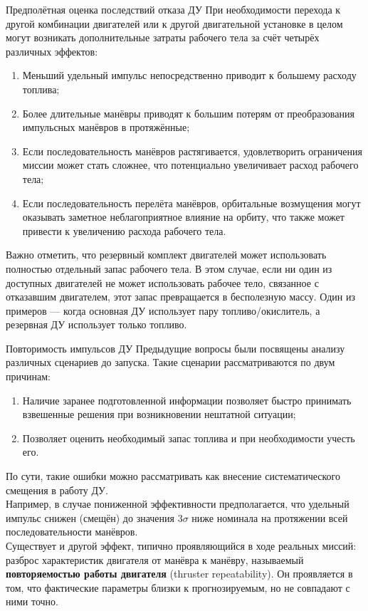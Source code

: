 \documentclass[8pt]{beamer}
\begin{document}
\begin{frame}{Предполётная оценка последствий отказа ДУ}
При необходимости перехода к другой комбинации двигателей или к другой двигательной установке в целом могут возникать дополнительные затраты рабочего тела за счёт четырёх различных эффектов:
\begin{enumerate}
    \item Меньший удельный импульс непосредственно приводит к большему расходу топлива;
    \item Более длительные манёвры приводят к большим потерям от преобразования импульсных манёвров в протяжённые;
    \item Если последовательность манёвров растягивается, удовлетворить ограничения миссии может стать сложнее, что потенциально увеличивает расход рабочего тела;
    \item Если последовательность перелёта манёвров, орбитальные возмущения могут оказывать заметное неблагоприятное влияние на орбиту, что также может привести к увеличению расхода рабочего тела.
\end{enumerate}

Важно отметить, что резервный комплект двигателей может использовать полностью отдельный запас рабочего тела. В этом случае, если ни один из доступных двигателей не может использовать рабочее тело, связанное с отказавшим двигателем, этот запас превращается в бесполезную массу. Один из примеров — когда основная ДУ использует пару топливо/окислитель, а резервная ДУ использует только топливо.
\end{frame}

\begin{frame}{Повторимость импульсов ДУ}
Предыдущие вопросы были посвящены анализу различных сценариев до запуска. Такие сценарии рассматриваются по двум причинам:
\begin{enumerate}
    \item Наличие заранее подготовленной информации позволяет быстро принимать взвешенные решения при возникновении нештатной ситуации;
    \item Позволяет оценить необходимый запас топлива и при необходимости учесть его.
\end{enumerate}

По сути, такие ошибки можно рассматривать как внесение систематического смещения в работу ДУ. \\
\smallskip
Например, в случае пониженной эффективности предполагается, что удельный импульс снижен (смещён) до значения $3 \sigma$ ниже номинала на протяжении всей последовательности манёвров. \\
\smallskip
Существует и другой эффект, типично проявляющийся в ходе реальных миссий: разброс характеристик двигателя от манёвра к манёвру, называемый \textbf{повторяемостью работы двигателя} (thruster repeatability). Он проявляется в том, что фактические параметры близки к прогнозируемым, но не совпадают с ними точно.
\end{frame}
\end{document}
